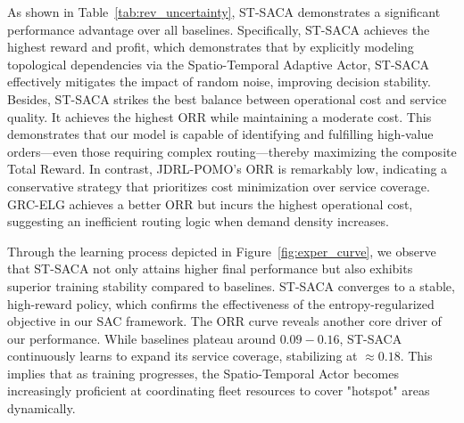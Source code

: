 \documentclass[lettersize,journal]{IEEEtran}
\begin{document}
As shown in Table~\ref{tab:rev_uncertainty}, ST-SACA demonstrates a significant performance advantage over all baselines. Specifically, ST-SACA achieves the highest reward and profit, which demonstrates that by explicitly modeling topological dependencies via the Spatio-Temporal Adaptive Actor, ST-SACA effectively mitigates the impact of random noise, improving decision stability. Besides, ST-SACA strikes the best balance between operational cost and service quality. It achieves the highest ORR while maintaining a moderate cost. This demonstrates that our model is capable of identifying and fulfilling high-value orders—even those requiring complex routing—thereby maximizing the composite Total Reward. In contrast, JDRL-POMO's ORR is remarkably low, indicating a conservative strategy that prioritizes cost minimization over service coverage. GRC-ELG achieves a better ORR but incurs the highest operational cost, suggesting an inefficient routing logic when demand density increases.

Through the learning process depicted in Figure~\ref{fig:exper_curve}, we observe that ST-SACA not only attains higher final performance but also exhibits superior training stability compared to baselines. ST-SACA converges to a stable, high-reward policy, which confirms the effectiveness of the entropy-regularized objective in our SAC framework. The ORR curve reveals another core driver of our performance. While baselines plateau around $0.09-0.16$, ST-SACA continuously learns to expand its service coverage, stabilizing at $\approx 0.18$. This implies that as training progresses, the Spatio-Temporal Actor becomes increasingly proficient at coordinating fleet resources to cover "hotspot" areas dynamically.

\begin{table}[htbp]
\caption{\textcolor{blue}{Performance Comparison under Time-Varying Demand}}
\label{tab:rev_uncertainty}
\begin{center}
\color{blue}
\end{center}
\end{table}
\end{document}
